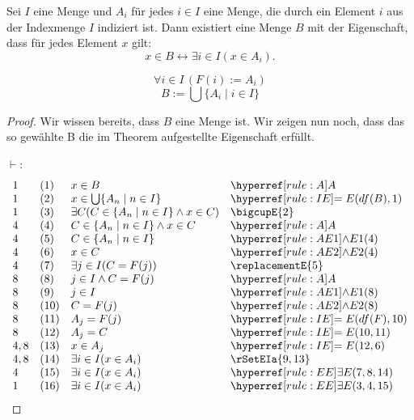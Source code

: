 \documentclass[main.tex]{subfiles}
\begin{document}
\label{xInBLrExiInILpxInASubiRp}
\begin{theorem}
    Sei \( I \) eine Menge und \( A_i \) für jedes \( i \in I \) eine Menge, die durch ein Element \( i \) aus der Indexmenge \( I \) indiziert ist. Dann existiert eine Menge \( B \) mit der Eigenschaft, dass für jedes Element \( x \) gilt:
    \[
    x \in B \leftrightarrow \exists i \in I(x \in A_i).
    \]
\end{theorem}

\begin{tempdefinition}
    \[
    \forall i \in I \, (F(i) := A_i)
    \]
    \[
    B := \bigcup \{ A_i \mid i \in I \}
    \]
\end{tempdefinition}

\begin{proof}
    Wir wissen bereits, dass \(B\) eine Menge ist. Wir zeigen nun noch, dass das so gewählte B die im Theorem aufgestellte Eigenschaft erfüllt.

    
    \(\vdash\):
    \[
	\begin{array}{llll}
		1 &  (1) & x\in B & \rA \\
		1 &  (2) & x\in\bigcup\{A_n\mid n\in I\} & \rIE{df(B), 1} \\			
		1 &  (3) & \exists C(C\in \{A_n\mid n\in I\}\land x\in C)  & \bigcupE{2} \\
		4 &  (4) & C\in \{A_n\mid n\in I\}\land x\in C & \rA \\	
  	4 &  (5) & C\in \{A_n\mid n\in I\} & \rAEa{4} \\	
        4 &  (6) & x\in C & \rAEb{4} \\
        4 &  (7) & \exists j\in I(C = F(j)) & \replacementE{5} \\
        8 &  (8) & j\in I\land C = F(j) & \rA \\
        8 &  (9) & j\in I & \rAEa{8} \\
        8 &  (10) & C=F(j) & \rAEb{8} \\
        8 &  (11) & A_j = F(j) & \rIE{df(F), 10} \\
        8 &  (12) & A_j=C & \rIE{10,11} \\
        4,8 &  (13) & x\in A_j & \rIE{12,6} \\
        4,8 &  (14) & \exists i\in I(x\in A_i) & \rSetEIa{9,13} \\
        4 &  (15) & \exists i\in I(x\in A_i) & \rEE{7,8,14} \\
        1 &  (16) & \exists i\in I(x\in A_i) & \rEE{3,4,15} \\
	\end{array}
    \]


\end{proof}
\end{document}
